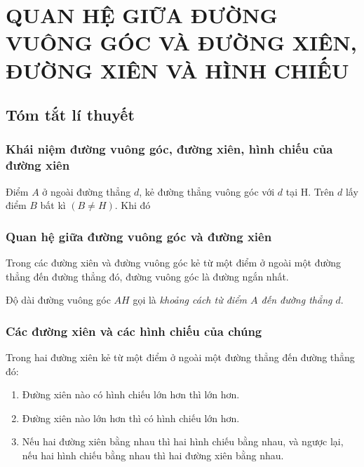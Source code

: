 \section{QUAN HỆ GIỮA ĐƯỜNG VUÔNG GÓC VÀ ĐƯỜNG XIÊN, ĐƯỜNG XIÊN VÀ HÌNH CHIẾU}
\subsection{Tóm tắt lí thuyết}
\subsubsection{Khái niệm đường vuông góc, đường xiên, hình chiếu của đường xiên}
Điểm $A$ ở ngoài đường thẳng $d$, kẻ đường thẳng vuông góc với $d$ tại H. Trên $d$ lấy điểm $B$ bất kì $(B \neq H)$. Khi đó
{
}

\subsubsection{Quan hệ giữa đường vuông góc và đường xiên}
Trong các đường xiên và đường vuông góc kẻ từ một điểm ở ngoài một đường thẳng đến đường thẳng đó, đường vuông góc là đường ngắn nhất.
\begin{note}
	Độ dài đường vuông góc $AH$ gọi là \textit{khoảng cách từ điểm $A$ đến đường thẳng $d$}.
\end{note}

\subsubsection{Các đường xiên và các hình chiếu của chúng}
Trong hai đường xiên kẻ từ một điểm ở ngoài một đường thẳng đến đường thẳng đó:
\begin{enumerate}
	\item Đường xiên nào có hình chiếu lớn hơn thì lớn hơn.	
	\item Đường xiên nào lớn hơn thì có hình chiếu lớn hơn.
	\item Nếu hai đường xiên bằng nhau thì hai hình chiếu bằng nhau, và ngược lại, nếu hai hình chiếu bằng nhau thì hai đường xiên bằng nhau.
\end{enumerate}	

